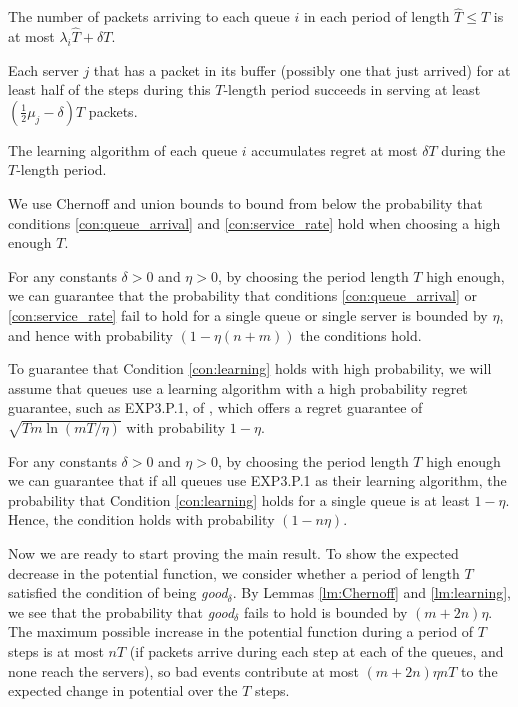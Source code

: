 \begin{condition}
\label{con:queue_arrival}
    The number of packets arriving to each queue $i$ in each period of length $\hat T \le T$ is at most $\lambda_i\hat T+\delta T$.
\end{condition}

\begin{condition}
\label{con:service_rate}
    Each server $j$ that has a packet in its buffer (possibly one that just arrived)  for at least half of the steps during this $T$-length period succeeds in serving at least $(\frac12\mu_j-\delta) T$ packets. 
\end{condition}
\begin{condition}\label{con:learning}
The learning algorithm of each queue $i$ accumulates regret at most $\delta T$ during the $T$-length period.
\end{condition}

We use Chernoff and union bounds to bound from below the probability that conditions \ref{con:queue_arrival} and \ref{con:service_rate} hold when choosing a high enough $T$.


\begin{lemma}
\label{lm:Chernoff}
For any constants $\delta>0$ and $\eta>0$, by choosing the period length $T$ high enough, we can guarantee that the probability that conditions \ref{con:queue_arrival} or \ref{con:service_rate} fail to hold for a single queue or single server is bounded by $\eta$, and hence with probability $(1-\eta(n+m))$ the conditions hold. 
\end{lemma}

To guarantee that Condition \ref{con:learning} holds with high probability, we will assume that queues use a learning algorithm with a high probability regret guarantee, such as EXP3.P.1, of \cite{DBLP:journals/siamcomp/AuerCFS02}, which offers a regret guarantee of $\sqrt{Tm\ln(m T/\eta)}$ with probability $1-\eta$.

\begin{lemma}
\label{lm:learning}
For any constants $\delta>0$ and $\eta>0$, by choosing the period length $T$ high enough we can guarantee that if all queues use  EXP3.P.1 as their learning algorithm,  the probability that Condition \ref{con:learning} holds for a single queue is at least $1-\eta$. Hence, the condition holds with probability $(1-n\eta).$ 
\end{lemma}

Now we are ready to start proving the main result. To show the expected decrease in the potential function, we consider whether a period of length $T$ satisfied the condition of being 
\emph{good}$_\delta$. By Lemmas \ref{lm:Chernoff} and \ref{lm:learning}, we see that the probability that \emph{good$_\delta$} fails to hold is bounded by $(m+2n)\eta$. The maximum possible increase in the potential function during a period of $T$ steps is at most $nT$ (if packets arrive during each step at each of the queues, and none reach the servers), so bad events contribute at most $(m+2n)\eta nT$ to the expected change in potential over the $T$ steps. 

